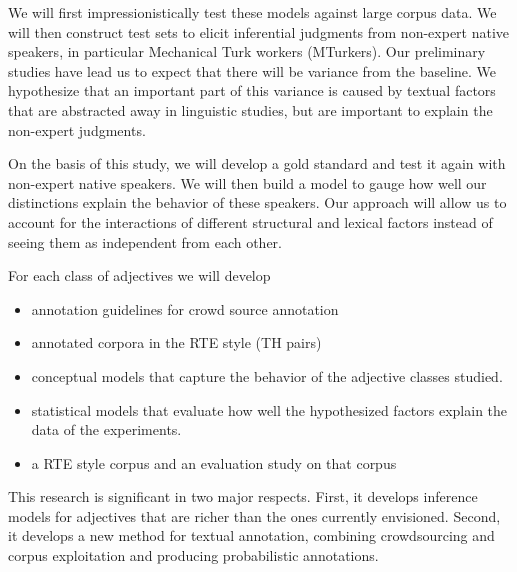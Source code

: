 \documentclass[10pt]{article}
\newcommand{\moveup}{\vspace*{-1.8mm}}
\begin{document}
We will first impressionistically test these models against large corpus data. We will then construct test sets to elicit inferential judgments from non-expert native speakers, in particular Mechanical Turk workers (MTurkers). Our preliminary studies have lead us to expect that there will be variance from the baseline. We hypothesize that an important part of this variance is caused by textual factors that are abstracted away in linguistic studies, but are important to explain the non-expert judgments. 

On the basis of this study, we will develop a gold standard and test it again with non-expert native speakers. We will then build a model to gauge how well our distinctions explain the behavior of these speakers. Our approach will allow us to account for the interactions of different structural and lexical factors instead of seeing them as independent from each other. 

For each class of adjectives we will develop
\begin{itemize}
\moveup
\item annotation guidelines for crowd source annotation
\moveup
\item annotated corpora in the RTE style (TH pairs)
\moveup
\item conceptual models that capture the behavior of the adjective classes studied.
\moveup
\item statistical models that evaluate how well the hypothesized factors explain the data of the experiments.
\moveup
\moveup
\moveup
\item a RTE style corpus and an evaluation study on that corpus
\moveup
\end{itemize} 

This research is significant in two major respects. First, it develops inference models for adjectives that are richer than the ones currently envisioned. Second, it develops a new method for textual annotation, combining crowdsourcing and corpus exploitation and producing probabilistic annotations.

\end{document}
